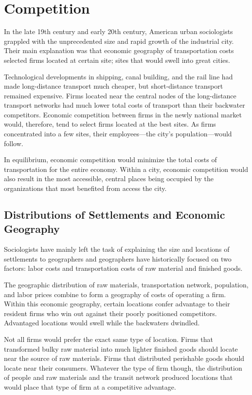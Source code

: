 \section*{Competition} 
In the late 19th century and early 20th century, American urban
sociologists grappled with the unprecedented size and rapid growth of
the industrial city. Their main explanation was that economic
geography of transportation costs selected firms located at certain site;
sites that would swell into great cities.

Technological developments in shipping, canal building, and the rail
line had made long-distance transport much cheaper, but short-distance
transport remained expensive. Firms located near the central nodes of
the long-distance transport networks had much lower total costs of
transport than their backwater competitors. Economic competition
between firms in the newly national market would, therefore, tend to
select firms located at the best sites. As firms concentrated into a
few sites, their employees---the city's population---would follow.

In equilibrium, economic competition would minimize the total costs
of transportation for the entire economy.  Within a city, economic
competition would also result in the most accessible, central places
being occupied by the organizations that most benefited from
access the city.

\subsection*{Distributions of Settlements and Economic Geography}
Sociologists have mainly left the task of explaining the size and
locations of settlements to geographers and geographers have
historically focused on two factors: labor costs and transportation
costs of raw material and finished goods.\cite{firey_land_1947,mckenzie_ecological_1924}

The geographic distribution of raw materials, transportation network,
population, and labor prices combine to form a geography of costs of
operating a firm. Within this economic geography, certain locations
confer advantage to their resident firms who win out against their
poorly positioned competitors. Advantaged locations would swell while
the backwaters dwindled.\cite{harris_nature_1945}

Not all firms would prefer the exact same type of location. Firms that
transformed bulky raw material into much lighter finished goods should
locate near the source of raw materials. Firms that distributed
perishable goods should locate near their consumers. Whatever the type
of firm though, the distribution of people and raw materials and the
transit network produced locations that would place that type of firm
at a competitive advantage.

